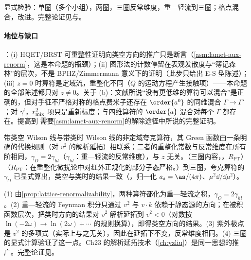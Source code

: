 \begin{proofsketch}
显式检验：单圈（多个小组），两圈\cite{Ji:2015jwa}，三圈反常维度\cite{Braun:2020ymy}，重—轻流到三圈\cite{Chetyrkin:2003vi}；格点混合\cite{Constantinou:2017sej,Chen:2017mie}，改进\cite{Green:2020xco}。完整论证见\cite{Ji:2017oey,Ishikawa:2017faj}与\cite[第~III.A~节]{JiEtAl2021}。
\end{proofsketch}

\paragraph{地位与缺口}
\tagA：(i) HQET/BRST 可重整性证明向类空方向的推广只是断言（\cref{asm:lamet-aux-renorm}，这是本命题的瓶颈）；(ii) 图形法的计数停留在表观发散度与“簿记森林”的层次，不是 BPHZ/Zimmermann 意义下的证明（此步只给出 E-S 型陈述）；(iii) $z=0$ 时算符是定域流，重整化不同（$Q$ 的运动方程产生接触项）——本命题的全部陈述都只对 $z\neq0$。关于 (b)：文献\cite{Ji:2017oey}所说“没有更低维的算符可以混合”是正确的，但对手征不严格对称的格点费米子还存在 $\order{a^0}$ 的同维混合 $\Gamma\to\Gamma'$\cite{Green:2017xeu,Constantinou:2017sej,Chen:2017mie}；对 $\gamma^t$，$r_{\rm mix}^2$ 项只是重新标度；与四维算符的 $\order{a}$ 混合对每个 $\Gamma$ 都存在。提高到 \tagR 需要\cref{asm:lamet-aux-renorm}的解除途径中所说的完整证明。

\begin{proposition}\label{prop:lamet-ad-spacelike}
带类空 Wilson 线与带类时 Wilson 线的非定域夸克算符，其 Green 函数由一条明确的代换规则（对 $v^2$ 的解析延拓）相联系；二者的重整化常数与反常维度在所有阶相同，$\gamma_O=2\gamma_{hl}$（$\gamma_{hl}$：重—轻流的反常维度），与 $z$ 无关。（三圈内容，\tagR，$R_{\mathrm{PT}}$）（$R_{\mathrm{PT}}$：在重整化微扰论中对红外正规化的部分子态严格。）到三圈，夸克算符的 $\gamma_O$ 已显式算出，类空与类时的结果一致（\cite[附录~A]{Braun:2020ymy}，归一化 $a_s=\as/(4\pi)$、$\mu^2\dd/\dd\mu^2$）。
\end{proposition}

\begin{proofsketch}
(1) 由\cref{prop:lattice-renormalizability}，两种算符都化为重—轻流之积，$\gamma_O=2\gamma_{hl}$。(2) 重—轻流的 Feynman 积分只通过 $v^2$ 与 $v\cdot k$ 依赖于静态源的方向；在被积函数层次，把类时方向的结果对 $v^2$ 解析延拓到 $v^2<0$（对数按 $\ln(-2\omega)\to\ln(2\omega)+\cdots$ 的规则换算），即得类空方向的结果\cite{Braun:2020ymy}。(3) 紫外极点是 $v^2$ 的多项式（实际上与之无关），因此在延拓下不变，反常维度相同。(4) 三圈的显式计算验证了这一点。Ch23 的解析延拓技术（\cref{ch:yzliu}）是同一思想的推广。完整论证见\cite{Braun:2020ymy}。
\end{proofsketch}

